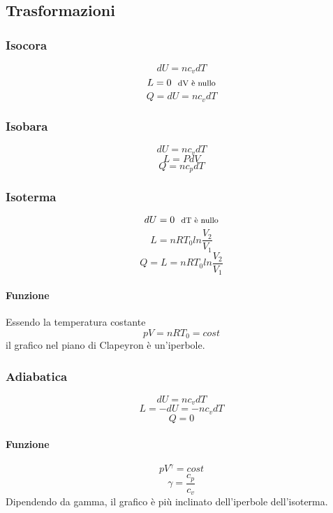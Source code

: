 \documentclass[12pt]{article}
\begin{document}
    \subsection{Trasformazioni}
        \subsubsection{Isocora}
        \[dU = n c_v dT\]
        \[L = 0 \:\:\: \text{\footnotesize{dV è nullo}}\]
        \[Q = dU = n c_v dT\]
        \subsubsection{Isobara}
        \[dU = n c_v dT\]
        \[L = P dV \]
        \[Q = n c_p dT\]
        \subsubsection{Isoterma}
        \[dU = 0 \:\:\: \text{\footnotesize{dT è nullo}}\]
        \[L = n R T_0 ln{\frac{V_2}{V_1}}\]
        \[Q = L = n R T_0 ln{\frac{V_2}{V_1}}\]
        \paragraph*{Funzione}
        Essendo la temperatura costante
        \[pV = nRT_0 = cost\]
        il grafico nel piano di Clapeyron è un'iperbole.
        \subsubsection{Adiabatica}
        \[dU = n c_v dT\]
        \[L = -dU = -n c_v dT\]
        \[Q = 0\]
        \paragraph*{Funzione}
        \[pV^{\gamma} = cost\]
        \[\gamma = \frac{c_p}{c_v}\]
        Dipendendo da gamma, il grafico è più inclinato dell'iperbole dell'isoterma.
\end{document}
